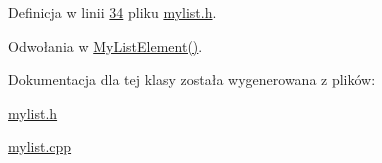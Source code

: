 Definicja w linii \hyperlink{mylist_8h_source_l00034}{34} pliku \hyperlink{mylist_8h_source}{mylist.\-h}.



Odwołania w \hyperlink{mylist_8cpp_source_l00017}{My\-List\-Element()}.



Dokumentacja dla tej klasy została wygenerowana z plików\-:\begin{DoxyCompactItemize}
\item 
\hyperlink{mylist_8h}{mylist.\-h}\item 
\hyperlink{mylist_8cpp}{mylist.\-cpp}\end{DoxyCompactItemize}
